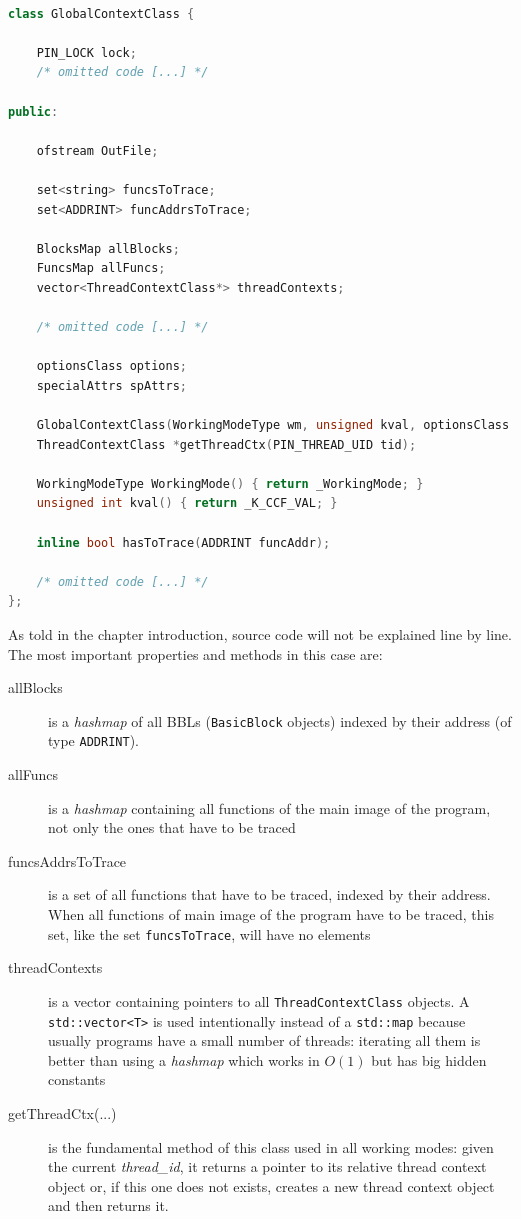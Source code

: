 \documentclass[a4paper,11pt]{report}
\begin{document}
\begin{lstlisting}[language=C++, 
	caption={partial implementation of \texttt{GlobalContextClass}}, label=globalCtx, frame=leftline]

class GlobalContextClass {
	
	PIN_LOCK lock;
	/* omitted code [...] */

public:

	ofstream OutFile;

	set<string> funcsToTrace;
	set<ADDRINT> funcAddrsToTrace;

	BlocksMap allBlocks;
	FuncsMap allFuncs;
	vector<ThreadContextClass*> threadContexts;

	/* omitted code [...] */

	optionsClass options;
	specialAttrs spAttrs;

	GlobalContextClass(WorkingModeType wm, unsigned kval, optionsClass options);
	ThreadContextClass *getThreadCtx(PIN_THREAD_UID tid);

	WorkingModeType WorkingMode() { return _WorkingMode; }
	unsigned int kval() { return _K_CCF_VAL; }

	inline bool hasToTrace(ADDRINT funcAddr);

	/* omitted code [...] */
};

\end{lstlisting}

\noindent
As told in the chapter introduction, source code will not be explained line by line.
The most important properties and methods in this case are:
\begin{description}
\item[allBlocks] is a \emph{hashmap} of all BBLs (\verb|BasicBlock| objects) indexed by their address (of type \verb|ADDRINT|).
\item[allFuncs] is a \emph{hashmap} containing all functions of the main image of the
program, not only the ones that have to be traced
\item[funcsAddrsToTrace] is a set of all functions that have to be traced, indexed 
by their address. When all functions of main image of the program have to be traced,
this set, like the set \verb|funcsToTrace|, will have no elements
\item[threadContexts] is a vector containing pointers to all \verb|ThreadContextClass| objects. A \verb|std::vector<T>| is used intentionally instead of a \verb|std::map| because
usually programs have a small number of threads: iterating all them is better than using a \emph{hashmap} which works in $O(1)$ but has big hidden constants
\item[getThreadCtx(...)] is the fundamental method of this class used in all working modes:
given the current \emph{thread\_id}, it returns a pointer to its relative thread context object or, if this one does not exists, creates a new thread context object and then returns it.
\end{description}
\end{document}
